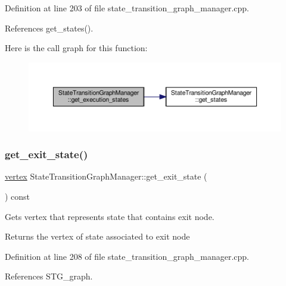 Definition at line 203 of file state\+\_\+transition\+\_\+graph\+\_\+manager.\+cpp.



References get\+\_\+states().

Here is the call graph for this function\+:
\nopagebreak
\begin{figure}[H]
\begin{center}
\leavevmode
\includegraphics[width=350pt]{d9/dfd/classStateTransitionGraphManager_afdd93a2fc9f27b2c795bef76f62a07f8_cgraph}
\end{center}
\end{figure}
\mbox{\label{classStateTransitionGraphManager_a90b68762a4640636759ca382c0e87aaf}} 
\subsubsection{\texorpdfstring{get\+\_\+exit\+\_\+state()}{get\_exit\_state()}}
{\footnotesize\ttfamily \hyperlink{graph_8hpp_abefdcf0544e601805af44eca032cca14}{vertex} State\+Transition\+Graph\+Manager\+::get\+\_\+exit\+\_\+state (\begin{DoxyParamCaption}{ }\end{DoxyParamCaption}) const}



Gets vertex that represents state that contains exit node. 

\begin{DoxyReturn}{Returns}
the vertex of state associated to exit node 
\end{DoxyReturn}


Definition at line 208 of file state\+\_\+transition\+\_\+graph\+\_\+manager.\+cpp.



References S\+T\+G\+\_\+graph.



